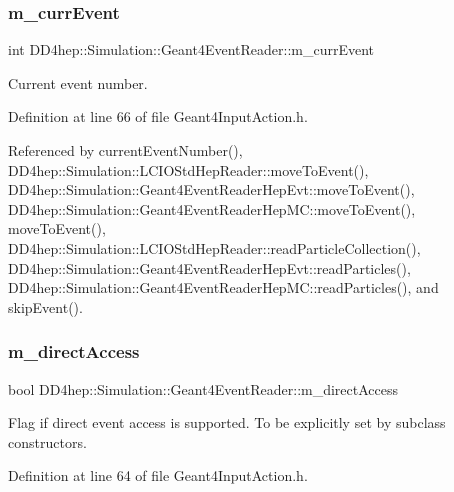 \subsubsection{\texorpdfstring{m\+\_\+curr\+Event}{m\_currEvent}}
{\footnotesize\ttfamily int D\+D4hep\+::\+Simulation\+::\+Geant4\+Event\+Reader\+::m\+\_\+curr\+Event\hspace{0.3cm}{\ttfamily [protected]}}



Current event number. 



Definition at line 66 of file Geant4\+Input\+Action.\+h.



Referenced by current\+Event\+Number(), D\+D4hep\+::\+Simulation\+::\+L\+C\+I\+O\+Std\+Hep\+Reader\+::move\+To\+Event(), D\+D4hep\+::\+Simulation\+::\+Geant4\+Event\+Reader\+Hep\+Evt\+::move\+To\+Event(), D\+D4hep\+::\+Simulation\+::\+Geant4\+Event\+Reader\+Hep\+M\+C\+::move\+To\+Event(), move\+To\+Event(), D\+D4hep\+::\+Simulation\+::\+L\+C\+I\+O\+Std\+Hep\+Reader\+::read\+Particle\+Collection(), D\+D4hep\+::\+Simulation\+::\+Geant4\+Event\+Reader\+Hep\+Evt\+::read\+Particles(), D\+D4hep\+::\+Simulation\+::\+Geant4\+Event\+Reader\+Hep\+M\+C\+::read\+Particles(), and skip\+Event().

\hypertarget{class_d_d4hep_1_1_simulation_1_1_geant4_event_reader_a1902827774d01fd87f38cbee29696fe0}{}\label{class_d_d4hep_1_1_simulation_1_1_geant4_event_reader_a1902827774d01fd87f38cbee29696fe0} 
\subsubsection{\texorpdfstring{m\+\_\+direct\+Access}{m\_directAccess}}
{\footnotesize\ttfamily bool D\+D4hep\+::\+Simulation\+::\+Geant4\+Event\+Reader\+::m\+\_\+direct\+Access\hspace{0.3cm}{\ttfamily [protected]}}



Flag if direct event access is supported. To be explicitly set by subclass constructors. 



Definition at line 64 of file Geant4\+Input\+Action.\+h.



